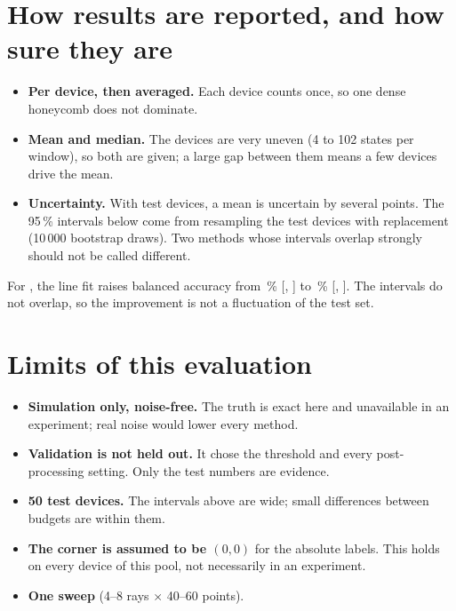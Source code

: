 \documentclass[10pt,a4paper]{article}
\begin{document}
\section{How results are reported, and how sure they are}

\begin{itemize}
\item \textbf{Per device, then averaged.}  Each device counts once, so one
  dense honeycomb does not dominate.
\item \textbf{Mean and median.}  The devices are very uneven (4 to 102 states
  per window), so both are given; a large gap between them means a few
  devices drive the mean.
\item \textbf{Uncertainty.}  With \vNTest{} test devices, a mean is uncertain
  by several points.  The 95\,\% intervals below come from resampling the
  test devices with replacement (10\,000 bootstrap draws).  Two methods whose
  intervals overlap strongly should not be called different.
\end{itemize}

\begin{table}[H]
\centering
\caption{Headline metrics with 95\,\% bootstrap intervals over the
\vNTest{} test devices: mean [low, high].  U-Net rows: \vBud.}
\small

\end{table}

\noindent
For \vBud, the line fit raises balanced accuracy from \vUBal\,\%
[\vUBalLo, \vUBalHi] to \vFBal\,\% [\vFBalLo, \vFBalHi].  The intervals do
not overlap, so the improvement is not a fluctuation of the test set.

\section{Limits of this evaluation}
\begin{itemize}
\item \textbf{Simulation only, noise-free.}  The truth is exact here and
  unavailable in an experiment; real noise would lower every method.
\item \textbf{Validation is not held out.}  It chose the threshold and every
  post-processing setting.  Only the test numbers are evidence.
\item \textbf{50 test devices.}  The intervals above are wide; small
  differences between budgets are within them.
\item \textbf{The corner is assumed to be $(0,0)$} for the absolute labels.
  This holds on every device of this pool, not necessarily in an
  experiment.
\item \textbf{One sweep} (4--8 rays $\times$ 40--60 points).
\end{itemize}
\end{document}
